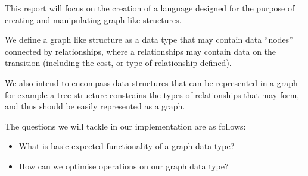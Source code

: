 This report will focus on the creation of a language designed for the purpose of creating and manipulating graph-like
structures.

We define a graph like structure as a data type that may contain data ``nodes'' connected by relationships, where a
relationships may contain data on the transition (including the cost, or type of relationship defined).

We also intend to encompass data structures that can be represented in a graph - for example a tree structure constrains
the types of relationships that may form, and thus should be easily represented as a graph.

\bigbreak

The questions we will tackle in our implementation are as follows:
\begin{itemize}
    \item What is basic expected functionality of a graph data type?
    \item How can we optimise operations on our graph data type?
\end{itemize}